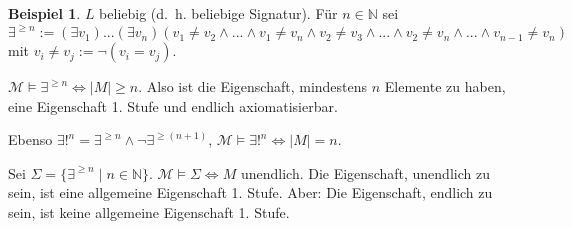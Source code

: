 \documentclass{article}
\theoremstyle{definition}
\newtheorem*{exm}{Beispiel}
\newcommand{\calM}{\mathcal{M}}
\begin{document}
    \begin{exm}
        $ L $ beliebig (d.~h. beliebige Signatur).
        Für $ n \in \mathbb{N} $ sei
        \begin{equation*}
            \exists^{\geq n} := (\exists v_1) ... (\exists v_n) (v_1 \not = v_2 \land ... \land v_1 \not = v_n \land v_2 \not = v_3 \land ... \land v_2 \not = v_n \land ... \land v_{n-1} \not = v_n)
        \end{equation*}
        mit $ v_i \not = v_j := \neg (v_i = v_j) $.

        $ \calM \models \exists^{\geq n} \Leftrightarrow | M | \geq n $.
        Also ist die Eigenschaft, mindestens $ n $ Elemente zu haben, eine Eigenschaft 1. Stufe und endlich axiomatisierbar.

        Ebenso $ \exists!^n = \exists^{\geq n} \land \neg \exists^{\geq(n+1)} $, $ \calM \models \exists!^n \Leftrightarrow |M| = n $.

        Sei $ \Sigma = \{ \exists^{\geq n} \mid n \in \mathbb{N} \} $.
        $ \calM \models \Sigma \Leftrightarrow M $ unendlich.
        Die Eigenschaft, unendlich zu sein, ist eine allgemeine Eigenschaft 1. Stufe.
        Aber: Die Eigenschaft, endlich zu sein, ist keine allgemeine Eigenschaft 1. Stufe.
    \end{exm}
\end{document}

